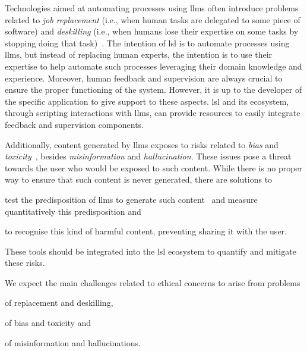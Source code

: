 \documentclass[manuscript,screen]{acmart}
\begin{document}
Technologies aimed at automating processes using \acp{llm} often introduce problems related to \emph{job replacement} (i.e., when human tasks are delegated to some piece of software) and \emph{deskilling} (i.e., when humans lose their expertise on some tasks by stopping doing that task)~\cite{DBLP:journals/ijhci/SisonDGG24}.
The intention of \ac{lsl} is to automate processes using \acp{llm}, but instead of replacing human experts, the intention is to use their expertise to help automate such processes leveraging their domain knowledge and experience.
Moreover, human feedback and supervision are always crucial to ensure the proper functioning of the system.
However, it is up to the developer of the specific application to give support to these aspects.
\ac{lsl} and its ecosystem, through scripting interactions with \acp{llm}, can provide resources to easily integrate feedback and supervision components.

Additionally, content generated by \acp{llm} exposes to risks related to \emph{bias} and \emph{toxicity}~\cite{10.1162/coli_a_00524}, besides \emph{misinformation} and \emph{hallucination}.
These issues pose a threat towards the user who would be exposed to such content.
While there is no proper way to ensure that such content is never generated, there are solutions to
\begin{enumerate*}[label=(\roman*)]
  \item test the predisposition of \acp{llm} to generate such content~\cite{DBLP:journals/tse/CorboBDLSC25} and measure quantitatively this predisposition and
  \item to recognise this kind of harmful content, preventing sharing it with the user.
\end{enumerate*}
These tools should be integrated into the \ac{lsl} ecosystem to quantify and mitigate these risks.

\begin{tcolorbox}[
    title=Ethical concerns, %
    left=1mm,
    right=1mm,
    top=1mm,
    bottom=1mm,
    fonttitle=\bfseries, %
    boxrule=0.5pt, %
    arc=5pt, %
    width=\columnwidth %
]
We expect the main challenges related to ethical concerns to arise from problems
\begin{enumerate*}[label=(\roman*)]
    \item of replacement and deskilling,
    \item of bias and toxicity and
    \item of misinformation and hallucinations.
\end{enumerate*}
\end{tcolorbox}
\end{document}
